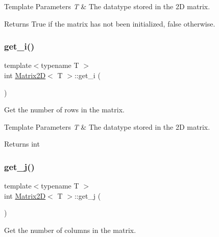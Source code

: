 \begin{DoxyTemplParams}{Template Parameters}
{\em T} & The datatype stored in the 2D matrix. \\
\hline
\end{DoxyTemplParams}
\begin{DoxyReturn}{Returns}
True if the matrix has not been initialized, false otherwise. 
\end{DoxyReturn}
\mbox{\label{classMatrix2D_a9d44e60eef0274c20ed9bd1f597c89eb}} 
\subsubsection{\texorpdfstring{get\+\_\+i()}{get\_i()}}
{\footnotesize\ttfamily template$<$typename T $>$ \\
int \mbox{\hyperlink{classMatrix2D}{Matrix2D}}$<$ T $>$\+::get\+\_\+i (\begin{DoxyParamCaption}{ }\end{DoxyParamCaption})}



Get the number of rows in the matrix. 


\begin{DoxyTemplParams}{Template Parameters}
{\em T} & The datatype stored in the 2D matrix. \\
\hline
\end{DoxyTemplParams}
\begin{DoxyReturn}{Returns}
int 
\end{DoxyReturn}
\mbox{\label{classMatrix2D_a30918dfce713408a9b3188bea33dbb57}} 
\subsubsection{\texorpdfstring{get\+\_\+j()}{get\_j()}}
{\footnotesize\ttfamily template$<$typename T $>$ \\
int \mbox{\hyperlink{classMatrix2D}{Matrix2D}}$<$ T $>$\+::get\+\_\+j (\begin{DoxyParamCaption}{ }\end{DoxyParamCaption})}



Get the number of columns in the matrix. 



